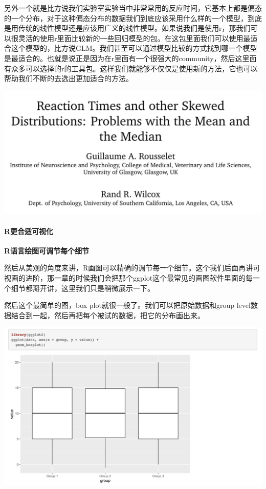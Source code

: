 \documentclass[
  oneside]{book}
\begin{document}
另外一个就是比方说我们实验室实验当中非常常用的反应时间，它基本上都是偏态的一个分布，对于这种偏态分布的数据我们到底应该采用什么样的一个模型，到底是用传统的线性模型还是应该用广义的线性模型。如果说我们是使用r，那我们可以很灵活的使用r里面比较新的一些回归模型的包。在这包里面我们可以使用最适合这个模型的，比方说GLM。我们甚至可以通过模型比较的方式找到哪一个模型是最适合的。也就是说正是因为在r里面有一个很强大的community，然后这里面有众多可以选择的r的工具包。这样我们就能够不仅仅是使用新的方法，它也可以帮助我们不断的去选出更加适合的方法。

\includegraphics{1001-lesson1/image-20230302201236318.png}

\hypertarget{rux66f4ux5408ux9002ux53efux89c6ux5316}{%
\paragraph{R更合适可视化}\label{rux66f4ux5408ux9002ux53efux89c6ux5316}}

\textbf{R语言绘图可调节每个细节}

然后从美观的角度来讲，R画图可以精确的调节每一个细节。这个我们后面再讲可视画的进阶，那一章的时候我们会把那个ggplot这个最常见的画图软件里面的每一个细节都掰开讲，这里我们只是稍微展示一下。

然后这个最简单的图，box plot就很一般了。我们可以把原始数据和group level数据结合到一起，然后再把每个被试的数据，把它的分布画出来。

\includegraphics{1001-lesson1/image-20230302201246104.png}
\end{document}
